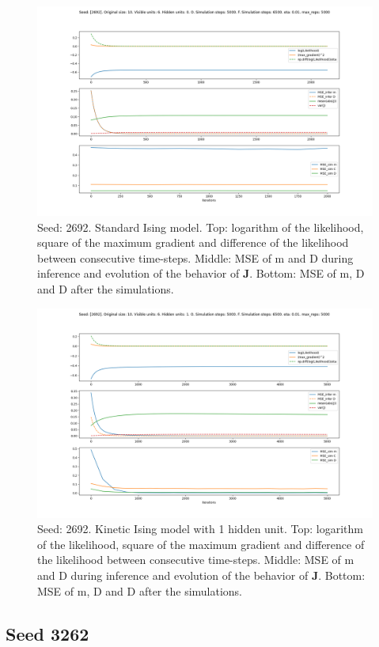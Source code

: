 \documentclass{article}
\def\*#1{\mathbf{#1}}
\begin{document}
\begin{figure}[!htb]
    \centering
    \includegraphics[width=0.7\linewidth]{images/sqrt_size/[2692]_10_6_0_5000_6500_eta001_5000_100.png}
\caption{Seed: 2692. Standard Ising model. Top: logarithm of the likelihood, square of the maximum gradient and difference of the likelihood between consecutive time-steps. Middle: MSE of m and D during inference and evolution of the behavior of $\*J$. Bottom: MSE of m, D and D after the simulations.}
\end{figure}


\begin{figure}[!htb]
    \centering
    \includegraphics[width=0.7\linewidth]{images/sqrt_size/[2692]_10_6_1_5000_6500_eta001_5000_100.png}
\caption{Seed: 2692. Kinetic Ising model with 1 hidden unit. Top: logarithm of the likelihood, square of the maximum gradient and difference of the likelihood between consecutive time-steps. Middle: MSE of m and D during inference and evolution of the behavior of $\*J$. Bottom: MSE of m, D and D after the simulations.}
\end{figure}



\newpage
\subsection{Seed 3262}
\end{document}
